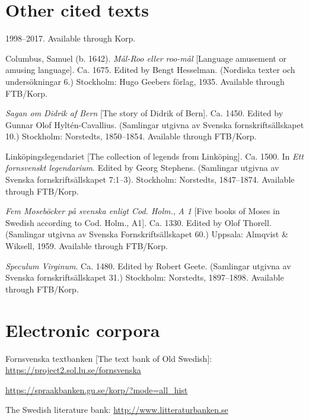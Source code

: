 \documentclass[output=paper, colorlinks, citecolor=brown]{langscibook}
\begin{document}
\section*{Other cited texts}

\begin{description}[font=\normalfont]\sloppy
\item[Bloggmix] [A selection of Swedish blogs] 1998–2017. Available through Korp.
\item[Columbus:]Columbus, Samuel (b. 1642). \textit{Mål-Roo eller roo-mål} [Language amusement or amusing language]. Ca. 1675. Edited by Bengt Hesselman. (Nordiska texter och undersökningar 6.) Stockholm: Hugo Geebers förlag, 1935. Available through FTB/Korp.
\item[Di:]\textit{Sagan om Didrik af Bern} [The story of Didrik of Bern]. Ca. 1450. Edited by Gunnar Olof Hyltén-Cavallius. (Samlingar utgivna av Svenska fornskriftsällskapet 10.) Stockholm: Norstedts, 1850–1854. Available through FTB/Korp.
\item[LinLeg:]Linköpingslegendariet [The collection of legends from Linköping]. Ca. 1500. In \textit{Ett fornsvenskt legendarium}. Edited by Georg Stephens. (Samlingar utgivna av Svenska fornskriftsällskapet 7:1–3). Stockholm: Norstedts, 1847–1874. Available through FTB/Korp.
\item[MB1B:]\textit{Fem Moseböcker på svenska enligt Cod. Holm.}, \textit{A 1} [Five books of Moses in Swedish according to Cod. Holm., A1]. Ca. 1330. Edited by Olof Thorell. (Samlingar utgivna av Svenska Fornskriftsällskapet 60.) Uppsala: Almqvist \& Wiksell, 1959. Available through FTB/Korp.
\item[SpecV:]\textit{Speculum Virginum}. Ca. 1480. Edited by Robert Geete. (Samlingar utgivna av Svenska fornskriftsällskapet 31.) Stockholm: Norstedts, 1897–1898. Available through FTB/Korp.
\end{description}

\section*{Electronic corpora}

\begin{description}[font=\normalfont]\sloppy
\item[FTB:] Fornsvenska textbanken [The text bank of Old Swedish]:  \url{https://project2.sol.lu.se/fornsvenska} 
\item[Korp:] \url{https://spraakbanken.gu.se/korp/?mode=all_hist}
\item[LB:] The Swedish literature bank: \url{http://www.litteraturbanken.se}
\end{description}

{\sloppy\printbibliography[heading=subbibliography,notkeyword=this]}
\end{document}
